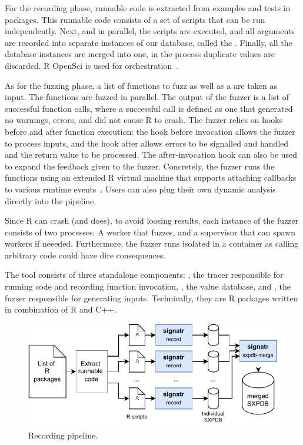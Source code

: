 \documentclass[sigplan,nonacm,anonymous,review]{acmart}
\begin{document}
For the recording phase, runnable code is extracted from examples and
tests in packages.  This runnable code consists of a set of scripts
that can be run independently. Next, and in parallel, the scripts are
executed, and all arguments are recorded into separate instances of
our database, called the \sxpdb.  Finally, all the database instances
are merged into one, in the process duplicate values are discarded.  R
OpenSci is used for orchestration~\cite{landau2021_targets}.

As for the fuzzing phase, a list of functions to fuzz as well as a
\sxpdb are taken as input. The functions are fuzzed in parallel.  The
output of the fuzzer is a list of successful function calls, where a
successful call is defined as one that generated no warnings, errors,
and did not cause R to crash.  The fuzzer relies on hooks before and
after function execution: the hook before invocation allows the fuzzer
to process inputs, and the hook after allows errors to be signalled
and handled and the return value to be processed.  The
after-invocation hook can also be used to expand the feedback given to
the fuzzer.  Concretely, the fuzzer runs the functions using an
extended R virtual machine that supports attaching callbacks to
various runtime events~\cite{goel2019}.  Users can also plug their own
dynamic analysis directly into the pipeline.

Since R can crash (and does), to avoid loosing results, each instance
of the fuzzer consists of two processes. A worker that fuzzes, and a
supervisor that can spawn workers if neeeded.  Furthermore, the fuzzer
runs isolated in a container as calling arbitrary code could have dire
consequences.

The tool consists of three standalone components: ,
the tracer responsible for running code and recording function
invocation, , the value database, and , the
fuzzer responsible for generating inputs.  Technically, they are R
packages written in combination of R and C++.

\begin{figure}
    \centering
    \includegraphics[width=\columnwidth]{code-and-figures/sxdb-pipeline.pdf}
    \caption{ Recording pipeline.  }\label{fig:sxpdb-pipeline}
\end{figure}
\end{document}
